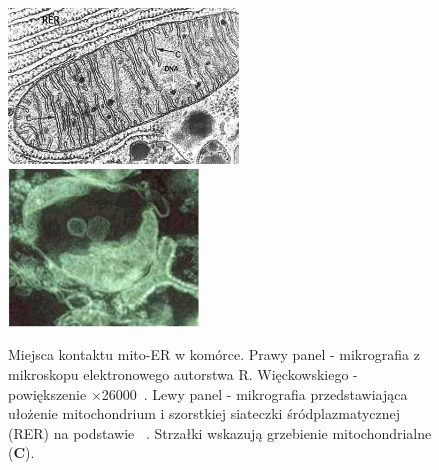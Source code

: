 \begin{figure}
  \centering
  \includegraphics[width=0.545\textwidth]{rysunki/rozdzial_1/mitochon_ER}
  \includegraphics[width=0.45\textwidth]{rysunki/rozdzial_1/MAM_picture1}
  \caption[Miejsca kontaktu mito-ER w komórce]{Miejsca kontaktu mito-ER w komórce. Prawy panel - mikrografia z mikroskopu elektronowego autorstwa R. Więckowskiego -powiększenie $\times$26000~\cite{Lebiedzinska2009}. Lewy panel - mikrografia przedstawiająca ułożenie mitochondrium i szorstkiej siateczki śródplazmatycznej (RER) na podstawie ~\cite{Scheffler1999}. Strzałki wskazują grzebienie mitochondrialne (\textbf{C}).}
  \label{fig:MAMelectro3}
\end{figure}


